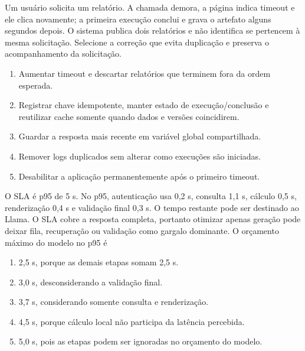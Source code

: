 \TextoBase
Um usuário solicita um relatório. A chamada demora, a página indica timeout e ele clica novamente; a primeira execução conclui e grava o artefato alguns segundos depois. O sistema publica dois relatórios e não identifica se pertencem à mesma solicitação.
\FonteDidatica
\Comando Selecione a correção que evita duplicação e preserva o acompanhamento da solicitação.
\begin{enumerate}[label=\Alph*)]
\item Aumentar timeout e descartar relatórios que terminem fora da ordem esperada.
\item Registrar chave idempotente, manter estado de execução/conclusão e reutilizar cache somente quando dados e versões coincidirem.
\item Guardar a resposta mais recente em variável global compartilhada.
\item Remover logs duplicados sem alterar como execuções são iniciadas.
\item Desabilitar a aplicação permanentemente após o primeiro timeout.
\end{enumerate}

\TextoBase
O SLA é p95 de 5 s. No p95, autenticação usa 0,2 s, consulta 1,1 s, cálculo 0,5 s, renderização 0,4 s e validação final 0,3 s. O tempo restante pode ser destinado ao Llama.
O SLA cobre a resposta completa, portanto otimizar apenas geração pode deixar fila, recuperação ou validação como gargalo dominante.
\FonteDidatica
\Comando O orçamento máximo do modelo no p95 é
\begin{enumerate}[label=\Alph*)]
\item 2,5 s, porque as demais etapas somam 2,5 s.
\item 3,0 s, desconsiderando a validação final.
\item 3,7 s, considerando somente consulta e renderização.
\item 4,5 s, porque cálculo local não participa da latência percebida.
\item 5,0 s, pois as etapas podem ser ignoradas no orçamento do modelo.
\end{enumerate}

